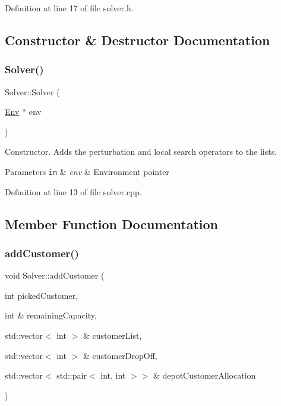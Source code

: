 Definition at line 17 of file solver.\+h.



\subsection{Constructor \& Destructor Documentation}
\mbox{\label{class_solver_a05ec0ef6028f51c1eba417b41a14c2ea}} 
\subsubsection{\texorpdfstring{Solver()}{Solver()}}
{\footnotesize\ttfamily Solver\+::\+Solver (\begin{DoxyParamCaption}\item[{\hyperlink{class_env}{Env} $\ast$}]{env }\end{DoxyParamCaption})}



Constructor. Adds the perturbation and local search operators to the lists. 


\begin{DoxyParams}[1]{Parameters}
\mbox{\tt in}  & {\em env} & Environment pointer \\
\hline
\end{DoxyParams}


Definition at line 13 of file solver.\+cpp.



\subsection{Member Function Documentation}
\mbox{\label{class_solver_a943fbc40cc9d9ede517db697f5f971e9}} 
\subsubsection{\texorpdfstring{add\+Customer()}{addCustomer()}}
{\footnotesize\ttfamily void Solver\+::add\+Customer (\begin{DoxyParamCaption}\item[{int}]{picked\+Customer,  }\item[{int \&}]{remaining\+Capacity,  }\item[{std\+::vector$<$ int $>$ \&}]{customer\+List,  }\item[{std\+::vector$<$ int $>$ \&}]{customer\+Drop\+Off,  }\item[{std\+::vector$<$ std\+::pair$<$ int, int $>$$>$ \&}]{depot\+Customer\+Allocation }\end{DoxyParamCaption})\hspace{0.3cm}{\ttfamily [private]}}



